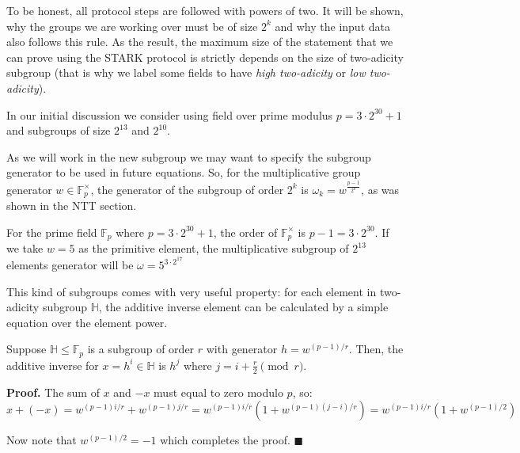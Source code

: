 \documentclass[../lecture-notes.tex]{subfiles}
\begin{document}
To be honest, all protocol steps are followed with powers of two. It will be shown, why the groups we are working over must be of size $2^k$ and why the input data also follows this rule. As the result, the maximum size of the statement that we can prove using the STARK protocol is strictly depends on the size of two-adicity subgroup (that is why we label some fields to have \textit{high two-adicity} or \textit{low two-adicity}).

\begin{remark}
In our initial discussion we consider using field over prime modulus $p = 3\cdot
2^{30} + 1$ and subgroups of size $2^{13}$ and $2^{10}$.
\end{remark}

As we will work in the new subgroup we may want to specify the subgroup
generator to be used in future equations. So, for the multiplicative group
generator $w \in \mathbb{F}_p^{\times}$, the generator of the subgroup of order
$2^k$ is $\omega_k = w^\frac{p - 1}{2^k}$, as was shown in the NTT section.

\begin{example}
For the prime field $\mathbb{F}_p$ where $p = 3\cdot 2^{30} + 1$, the order of $\mathbb{F}^{\times}_p$ is $p-1 = 3\cdot 2^{30}$. If we take $w = 5$ as the primitive element, the multiplicative subgroup of $2^{13}$ elements generator will be $\omega = 5^{3\cdot 2^{17}}$
\end{example}

This kind of subgroups comes with very useful property: for each element in
two-adicity subgroup $\mathbb{H}$, the additive inverse element
can be calculated by a simple equation over the element power.

\begin{proposition}
    Suppose $\mathbb{H} \leq \mathbb{F}_p$ is a subgroup of order $r$ with
    generator $h = w^{(p-1)/r}$. Then, the additive inverse for $x = h^i \in
    \mathbb{H}$ is $h^j$ where $j = i + \frac{r}{2} \pmod{r}$.
\end{proposition}

\textbf{Proof.} The sum of $x$ and $-x$ must equal to zero modulo $p$, so:
\begin{equation*}
x + (-x) = w^{(p-1)i/r} + w^{(p-1)j/r} = w^{(p-1)i/r}(1 + w^{(p-1)(j-i)/r}) = w^{(p-1)i/r}(1 + w^{(p-1)/2})
\end{equation*}

Now note that $w^{(p-1)/2} = -1$ which completes the proof. $\blacksquare$
\end{document}
